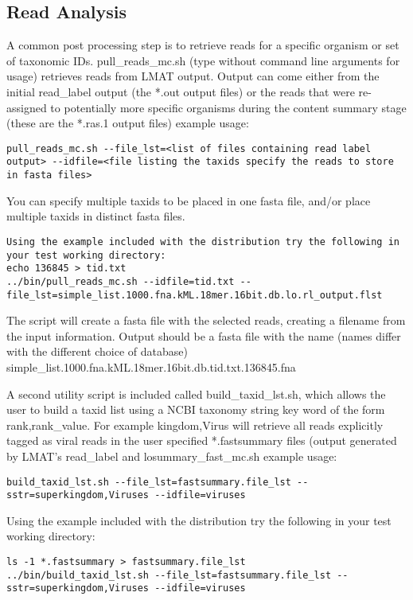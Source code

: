 \documentclass[11pt]{article}
\begin{document}
\subsection{Read Analysis}
A common post processing step is to retrieve reads for a specific organism or set of taxonomic IDs.
pull\_reads\_mc.sh (type without command line arguments for usage) retrieves reads from LMAT output.
Output can come either from the initial read_label output (the *.out output files) or the reads that
were re-assigned to potentially more specific organisms during the content summary stage (these are the *.ras.1 
output files)
example usage:
\begin{verbatim}
pull_reads_mc.sh --file_lst=<list of files containing read label output> --idfile=<file listing the taxids specify the reads to store in fasta files>
\end{verbatim}
You can specify multiple taxids to be placed in one fasta file, and/or place multiple taxids in distinct fasta files. 

\begin{verbatim}
Using the example included with the distribution try the following in your test working directory:
echo 136845 > tid.txt
../bin/pull_reads_mc.sh --idfile=tid.txt --file_lst=simple_list.1000.fna.kML.18mer.16bit.db.lo.rl_output.flst
\end{verbatim}

The script will create a fasta file with the selected reads, creating a filename from the input information. Output should be a fasta file with the name (names differ with the different choice of database)
simple_list.1000.fna.kML.18mer.16bit.db.tid.txt.136845.fna

A second utility script is included called {build_taxid_lst.sh}, which allows the user to build a taxid list using a NCBI taxonomy string key word of the form rank,rank_value.
For example kingdom,Virus will retrieve all reads explicitly tagged as viral reads in the user specified *.fastsummary files (output generated by LMAT's {read_label} and {losummary_fast_mc.sh}
example usage:
\begin{verbatim}
build_taxid_lst.sh --file_lst=fastsummary.file_lst --sstr=superkingdom,Viruses --idfile=viruses
\end{verbatim}

Using the example included with the distribution try the following in your test working directory:
\begin{verbatim}
ls -1 *.fastsummary > fastsummary.file_lst
../bin/build_taxid_lst.sh --file_lst=fastsummary.file_lst --sstr=superkingdom,Viruses --idfile=viruses
\end{verbatim}
\end{document}
